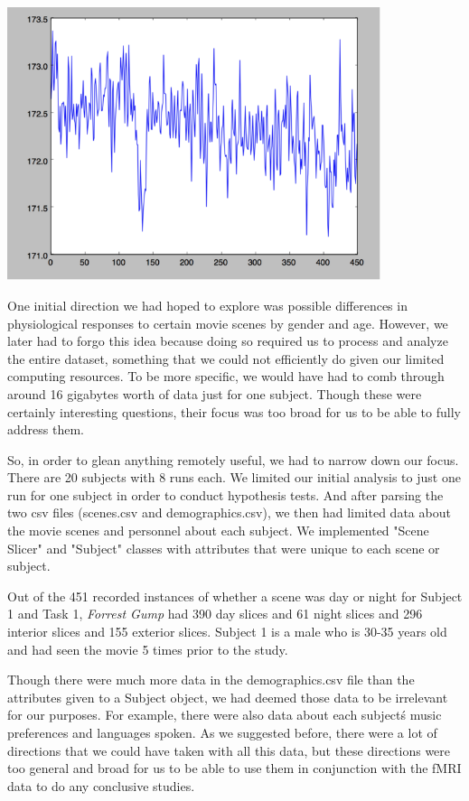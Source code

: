 \begin{center}
\includegraphics[height=8cm]{8}
\end{center}

One initial direction we had hoped to explore was possible differences in
physiological responses to certain movie scenes by gender and age. However, we
later had to forgo this idea because doing so required us to process and
analyze the entire dataset, something that we could not efficiently do given
our limited computing resources. To be more specific, we would have had to
comb through around 16 gigabytes worth of data just for one subject. Though
these were certainly interesting questions, their focus was too broad for us
to be able to fully address them.

So, in order to glean anything remotely useful, we had to narrow down our
focus. There are 20 subjects with 8 runs each. We limited our initial analysis
to just one run for one subject in order to conduct hypothesis tests. And
after parsing the two csv files (scenes.csv and demographics.csv), we then had
limited data about the movie scenes and personnel about each subject. We
implemented "Scene Slicer" and "Subject" classes with attributes that were
unique to each scene or subject.

Out of the 451 recorded instances of whether a scene was day or night for
Subject 1 and Task 1, \emph{Forrest Gump} had 390 day slices and 61 night slices and 296 interior slices and 155 exterior slices. Subject 1 is a male 
who is 30-35 years old and had seen the movie 5 times prior to the study.

Though there were much more data in the demographics.csv file than the
attributes given to a Subject object, we had deemed those data to be
irrelevant for our purposes. For example, there were also data about each
subject\'s music preferences and languages spoken. As we suggested before,
there were a lot of directions that we could have taken with all this data,
but these directions were too general and broad for us to be able to use them
in conjunction with the fMRI data to do any conclusive studies.


